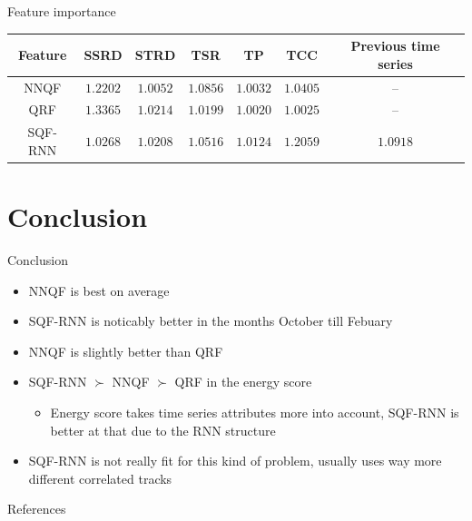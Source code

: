 \documentclass[10pt,aspectratio=169]{beamer}
\begin{document}
\begin{frame}{Feature importance}
    \begin{tabular}{c|cccccc}
        Feature & SSRD & STRD & TSR & TP & TCC & Previous time series \\
        \hline
        NNQF    & \(1.2202\) & \(1.0052\) & \(1.0856\) & \(1.0032\) & \(1.0405\) & -- \\
        QRF     & \(1.3365\) & \(1.0214\) & \(1.0199\) & \(1.0020\) & \(1.0025\) & -- \\
        SQF-RNN & \(1.0268\) & \(1.0208\) & \(1.0516\) & \(1.0124\) & \(1.2059\) & \(1.0918\)
    \end{tabular}
\end{frame}

\section{Conclusion}

\begin{frame}{Conclusion}
    \begin{itemize}
        \item NNQF is best on average
        \item SQF-RNN is noticably better in the months October till Febuary
        \item NNQF is slightly better than QRF
        \item SQF-RNN \(\succ\) NNQF \(\succ\) QRF in the energy score
        \begin{itemize}
            \item Energy score takes time series attributes more into account, SQF-RNN is better at that due to the RNN structure
        \end{itemize}
        \item SQF-RNN is not really fit for this kind of problem, usually uses way more different correlated tracks
    \end{itemize}
\end{frame}

\begin{frame}{References}
    \printbibliography[heading=none]
\end{frame}
\end{document}
